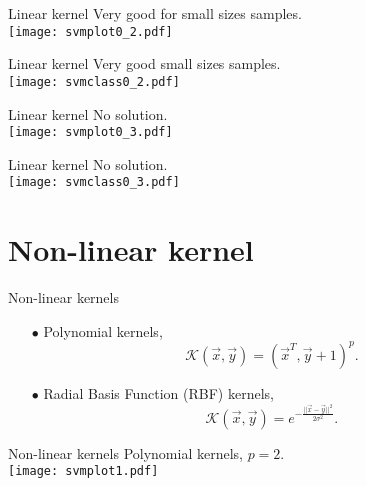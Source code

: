 \documentclass[unknownkeysallowed,10pt]{beamer}
\theoremstyle{definition} \newtheorem{rem}[thm]{Remark} \newtheorem*{rem*}{Remark}
\begin{document}
\begin{frame}{Linear kernel}
\vskip6pt
Very good for small sizes samples.\\
\centering
\texttt{[image: svmplot0\_2.pdf]}
\end{frame}

\begin{frame}[noframenumbering]{Linear kernel}
\vskip6pt
Very good small sizes samples.\\
\centering
\texttt{[image: svmclass0\_2.pdf]}
\end{frame}

\begin{frame}{Linear kernel}
\vskip6pt
No solution.\\
\centering
\texttt{[image: svmplot0\_3.pdf]}
\end{frame}

\begin{frame}[noframenumbering]{Linear kernel}
\vskip6pt
No solution.\\
\centering
\texttt{[image: svmclass0\_3.pdf]}
\end{frame}

\section{Non-linear kernel}

\begin{frame}{Non-linear kernels}
\begin{itemize}
 	\item[$\bullet$] Polynomial kernels,
 		\begin{equation*}
			\mathcal{K}(\vec{x},\vec{y}) = \left(\vec{x}^T, \vec{y} + 1\right)^p.
		\end{equation*}
	\item[$\bullet$] Radial Basis Function (RBF) kernels,\\
		\begin{equation*}
			\mathcal{K}(\vec{x},\vec{y}) = e^{-\frac{||\vec{x} - \vec{y}||^2}{2\sigma^2}}.
		\end{equation*}
\end{itemize}

\end{frame}

\begin{frame}{Non-linear kernels}
\vskip6pt
Polynomial kernels, $p=2$.\\
\centering
\texttt{[image: svmplot1.pdf]}
\end{frame}
\end{document}
